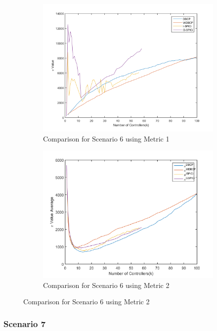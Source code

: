 \documentclass[10pt]{extarticle}
\begin{document}
	\begin{figure}
		\begin{subfigure}{0.5\linewidth}
			\includegraphics[width=\linewidth]{comparison_6.png}
			\caption{Comparison for Scenario 6 using Metric 1}
			\label{fig:comp6}
		\end{subfigure}
		\begin{subfigure}{0.5\linewidth}
			\includegraphics[width=\linewidth]{our_comp_6.png}
			\caption{Comparison for Scenario 6 using Metric 2}
			\label{fig:ourcomp6}
		\end{subfigure}
	\end{figure}
	
	\subsubsection{Scenario 7}
	
\end{document}
